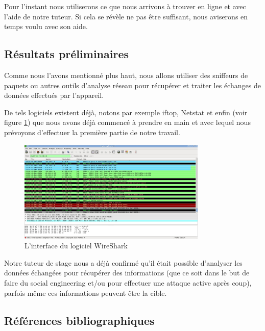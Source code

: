 \documentclass[a4paper, 12pt,twoside]{article}
\begin{document}
		Pour l'instant nous utiliserons ce que nous arrivons à trouver en ligne et avec l'aide de notre tuteur. Si cela se révèle ne pas être suffisant, nous aviserons en temps voulu avec son aide.

		\subsection{Résultats préliminaires}

		Comme nous l'avons mentionné plus haut, nous allons utiliser des sniffeurs de paquets ou autres outils d'analyse réseau pour récupérer et traiter les échanges de données effectués par l'appareil.
		
		De tels logiciels existent déjà, notons par exemple iftop, Netstat et enfin \wireshark{} (voir figure \ref{pic:wireshark}) que nous avons déjà commencé à prendre en main et avec lequel nous prévoyons d'effectuer la première partie de notre travail.
		
		\begin{figure}[!ht]
		\centering
		\includegraphics[width=0.8\textwidth]{wireshark.jpg}
		\caption{L'interface du logiciel WireShark}
		\label{pic:wireshark}
		\end{figure}
		
		Notre tuteur de stage nous a déjà confirmé qu'il était possible d'analyser les données échangées pour récupérer des informations (que ce soit dans le but de faire du social engineering et/ou pour effectuer une attaque active après coup), parfois même ces informations peuvent être la cible.
		
		\clearpage %
		\subsection{Références bibliographiques}
		{
		\renewcommand{\section}[2]{} %
		\nocite{*}
		
		
		}
\end{document}
